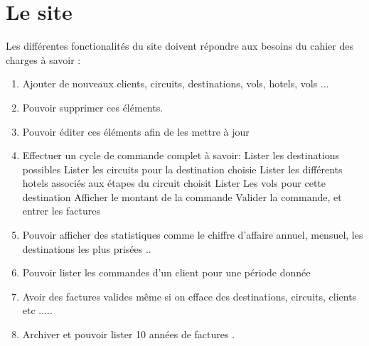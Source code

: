 \section{Le site}
Les diff\'erentes fonctionalit\'es du site doivent r\'epondre aux besoins du cahier des charges \`a savoir :

\begin{enumerate}
\item Ajouter de nouveaux clients, circuits, destinations, vols, hotels, vols ...
\item Pouvoir supprimer ces \'el\'ements.
\item Pouvoir \'editer ces \'el\'ements afin de les mettre \`a jour
\item Effectuer un cycle de commande complet \`a savoir:
\subitem Lister les destinations possibles
\subitem Lister les circuits pour la destination choisie
\subitem Lister les diff\'erents hotels associ\'es aux \'etapes du circuit choisit
\subitem Lister Les vols pour cette destination
\subitem Afficher le montant de la commande
\subitem Valider la commande, et entrer les factures
\item Pouvoir afficher des statistiques comme le chiffre d'affaire annuel, mensuel, les destinations les plus pris\'ees ..
\item Pouvoir lister les commandes d'un client pour une p\'eriode donn\'ee
\item Avoir des factures valides même si on efface des destinations, circuits, clients etc .....
\item Archiver et pouvoir lister 10 ann\'ees de factures .
\end{enumerate}